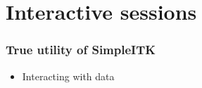 \section{Interactive sessions}

\begin{frame}
\frametitle{True utility of SimpleITK}
\begin{itemize}
\item Interacting with data
\end{itemize}
\end{frame}

